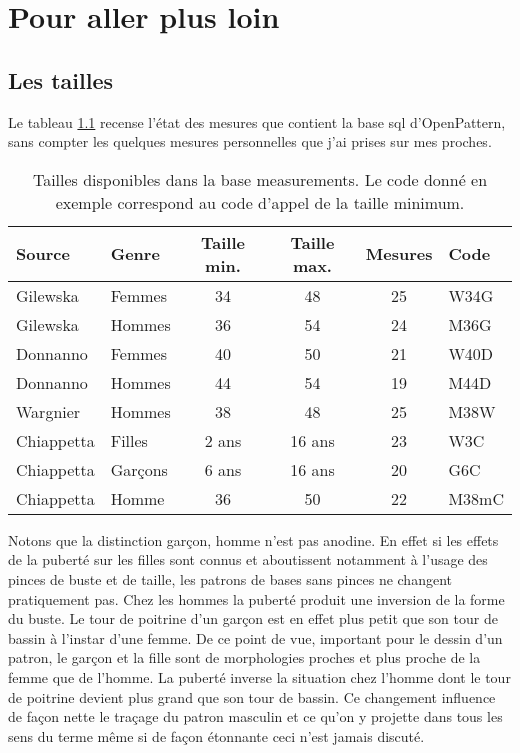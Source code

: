 \documentclass[10pt,a4paper,twoside]{report}
\begin{document}
\chapter{Pour aller plus loin}

\section{Les tailles}
\label{par:tailles}
Le tableau \ref{tab:meas_sum} recense l'état des mesures que contient la base sql d'OpenPattern, sans compter les quelques mesures personnelles que j'ai prises sur mes proches.

\begin{table}[htb]
\begin{center}
\begin{tabular}{llcccl} \hline
Source & Genre & Taille min. & Taille max. & Mesures & Code\\ \hline
Gilewska & Femmes & 34 & 48 & 25 &  W34G\\
Gilewska & Hommes & 36 & 54 & 24 & M36G\\
Donnanno & Femmes & 40 & 50 & 21 & W40D\\
Donnanno & Hommes & 44 & 54 & 19 & M44D\\
Wargnier & Hommes & 38 & 48 & 25 & M38W\\
Chiappetta & Filles & 2 ans & 16 ans &23& W3C\\
Chiappetta & Garçons & 6 ans & 16 ans &20& G6C\\
Chiappetta & Homme & 36 & 50 & 22 & M38mC\\ \hline
\end{tabular}
\end{center}
\label{tab:meas_sum}
\caption{Tailles disponibles dans la base measurements. Le code donné en exemple correspond au code d'appel de la taille minimum.}
\end{table}

Notons que la distinction garçon, homme n'est pas anodine. En effet si les effets de la puberté sur les filles sont connus et aboutissent notamment à l'usage  des pinces de buste et de taille, les patrons de bases sans pinces ne changent pratiquement pas. Chez les hommes la puberté produit une inversion de la forme du buste. Le tour de poitrine d'un garçon est en effet plus petit que  son tour de bassin à l'instar d'une femme. De ce point de vue, important pour le dessin d'un patron, le garçon et la fille sont de morphologies proches et plus proche de la femme que de l'homme. La puberté inverse la situation chez l'homme dont le tour de poitrine devient plus grand que son tour de bassin. Ce changement influence de façon nette le traçage du patron masculin et ce qu'on y projette dans tous les sens du terme même si de façon étonnante ceci n'est jamais discuté.
\end{document}
